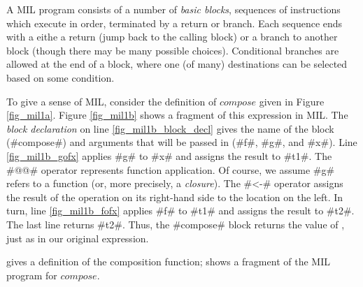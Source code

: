 \documentclass[12pt]{report}
\begin{document}
A MIL program consists of a number of \emph{basic blocks}, sequences
of instructions which execute in order, terminated by a return or
branch. Each sequence ends with a eithe a return (jump back to the
calling block) or a branch to another block (though there may be many
possible choices). Conditional branches are allowed at the end of a
block, where one (of many) destinations can be selected based on some
condition.

To give a sense of MIL, consider the definition of $compose$ given in
Figure \ref{fig_mil1a}. Figure \ref{fig_mil1b} shows a fragment of this 
expression in MIL. The \emph{block declaration}
on line \ref{fig_mil1b_block_decl} gives the name of
the block (#compose#) and arguments that will be passed in (#f#, #g#,
and #x#). Line \ref{fig_mil1b_gofx} applies #g# to #x# and assigns
the result to #t1#. The #@@# operator represents function application. 
Of course, we assume #g# refers to a function (or, more precisely, a 
\emph{closure}). The #<-# operator assigns the result of the operation
on its right-hand side to the location on the left. In turn, line 
\ref{fig_mil1b_fofx} applies #f# to #t1# and assigns the result
to #t2#. The last line returns #t2#. Thus, the #compose# block returns
the value of , just as in our original \lamA
expression.

\begin{myfig}[t]
  \subfloat[]{\label{fig_mil1b}}
  \caption{ gives a \lamA definition of the composition
    function;  shows a fragment of the MIL program
    for $compose$.}
  \label{fig_mil1}
\end{myfig}

\end{document}
